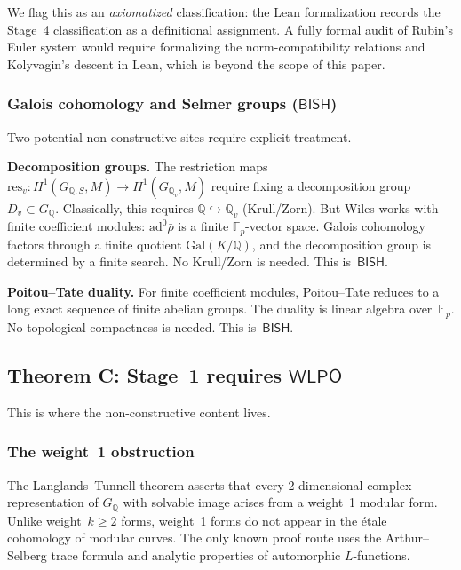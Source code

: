 \documentclass[11pt]{article}
\theoremstyle{plain}
\theoremstyle{definition}
\theoremstyle{remark}
\newcommand{\Q}{\mathbb{Q}}
\newcommand{\F}{\mathbb{F}}
\newcommand{\Qbar}{\overline{\Q}}
\newcommand{\Gal}{\mathrm{Gal}}
\newcommand{\BISH}{\mathsf{BISH}}
\newcommand{\WLPO}{\mathsf{WLPO}}
\begin{document}
We flag this as an \emph{axiomatized} classification: the Lean
formalization records the Stage~4 classification as a definitional
assignment.  A fully formal audit of Rubin's Euler system would
require formalizing the norm-compatibility relations and
Kolyvagin's descent in Lean, which is beyond the scope of this paper.

\subsubsection{Galois cohomology and Selmer groups (\texorpdfstring{$\BISH$}{BISH})}

Two potential non-constructive sites require explicit treatment.

\textbf{Decomposition groups.}
The restriction maps $\mathrm{res}_v : H^1(G_{\Q,S}, M) \to
H^1(G_{\Q_v}, M)$ require fixing a decomposition group
$D_v \subset G_\Q$.  Classically, this requires
$\Qbar \hookrightarrow \Qbar_v$ (Krull/Zorn).
But Wiles works with finite coefficient modules:
$\mathrm{ad}^0\bar{\rho}$ is a finite $\F_p$-vector space.
Galois cohomology factors through a finite quotient
$\Gal(K/\Q)$, and the decomposition group is determined by a
finite search.  No Krull/Zorn is needed.  This is~$\BISH$.

\textbf{Poitou--Tate duality.}
For finite coefficient modules, Poitou--Tate reduces to a long
exact sequence of finite abelian groups.  The duality is linear
algebra over~$\F_p$.  No topological compactness is needed.
This is~$\BISH$.


\subsection{Theorem C: Stage~1 requires \texorpdfstring{$\WLPO$}{WLPO}}\label{sec:lt}

This is where the non-constructive content lives.

\subsubsection{The weight~1 obstruction}

The Langlands--Tunnell theorem asserts that every 2-dimensional
complex representation of $G_\Q$ with solvable image arises from a
weight~1 modular form.  Unlike weight~$k \ge 2$ forms, weight~1
forms do not appear in the \'etale cohomology of modular curves.
The only known proof route uses the Arthur--Selberg trace
formula and analytic properties of automorphic $L$-functions.
\end{document}
